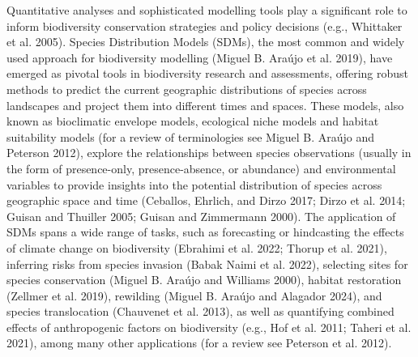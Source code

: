 \documentclass[
]{article}
\begin{document}
Quantitative analyses and sophisticated modelling tools play a
significant role to inform biodiversity conservation strategies and
policy decisions (e.g., Whittaker et al. 2005). Species Distribution
Models (SDMs), the most common and widely used approach for biodiversity
modelling (Miguel B. Araújo et al. 2019), have emerged as pivotal tools
in biodiversity research and assessments, offering robust methods to
predict the current geographic distributions of species across
landscapes and project them into different times and spaces. These
models, also known as bioclimatic envelope models, ecological niche
models and habitat suitability models (for a review of terminologies see
Miguel B. Araújo and Peterson 2012), explore the relationships between
species observations (usually in the form of presence-only,
presence-absence, or abundance) and environmental variables to provide
insights into the potential distribution of species across geographic
space and time (Ceballos, Ehrlich, and Dirzo 2017; Dirzo et al. 2014;
Guisan and Thuiller 2005; Guisan and Zimmermann 2000). The application
of SDMs spans a wide range of tasks, such as forecasting or hindcasting
the effects of climate change on biodiversity (Ebrahimi et al. 2022;
Thorup et al. 2021), inferring risks from species invasion (Babak Naimi
et al. 2022), selecting sites for species conservation (Miguel B. Araújo
and Williams 2000), habitat restoration (Zellmer et al. 2019), rewilding
(Miguel B. Araújo and Alagador 2024), and species translocation
(Chauvenet et al. 2013), as well as quantifying combined effects of
anthropogenic factors on biodiversity (e.g., Hof et al. 2011; Taheri et
al. 2021), among many other applications (for a review see Peterson et
al. 2012).
\end{document}
